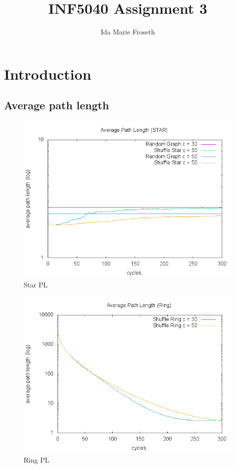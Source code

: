 \documentclass[UKenglish]{article}  %
\title{INF5040 Assignment 3}        %
\author{Ida Marie Froseth}                      %
\begin{document}
\maketitle{}
\cleardoublepage{}
\tableofcontents{}
\cleardoublepage{}

\section{Introduction}


\subsection{Average path length}
\begin{figure}
\includegraphics[scale=0.6]{plot/starPL.png}
	\caption{Star PL}
	\label{fig:starPL}
\end{figure}

\begin{figure}
\includegraphics[scale=0.6]{plot/ringPL.png}
	\caption{Ring PL}
	\label{fig:ringPL}
\end{figure}
\end{document}
